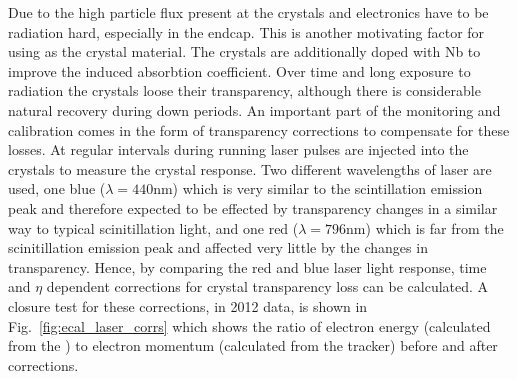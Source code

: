 Due to the high particle flux present at \CMS the \ECAL crystals and electronics have to be radiation hard, especially in the endcap. This is another motivating factor for using \PbWO as the crystal material. The crystals are additionally doped with Nb to improve the induced absorbtion coefficient. Over time and long exposure to radiation the crystals loose their transparency, although there is considerable natural recovery during down periods. An important part of the \ECAL monitoring and calibration comes in the form of transparency corrections to compensate for these losses. At regular intervals during \LHC running laser pulses are injected into the crystals to measure the crystal response. Two different wavelengths of laser are used, one blue ($\lambda=440$nm) which is very similar to the scintillation emission peak and therefore expected to be effected by transparency changes in a similar way to typical scinitillation light, and one red ($\lambda=796$nm) which is far from the scinitillation emission peak and affected very little by the changes in transparency. Hence, by comparing the red and blue laser light response, time and $\eta$ dependent corrections for crystal transparency loss can be calculated. A closure test for these corrections, in 2012 data, is shown in Fig.~\ref{fig:ecal_laser_corrs} which shows the ratio of electron energy (calculated from the \ECAL) to electron momentum (calculated from the tracker) before and after corrections. 

